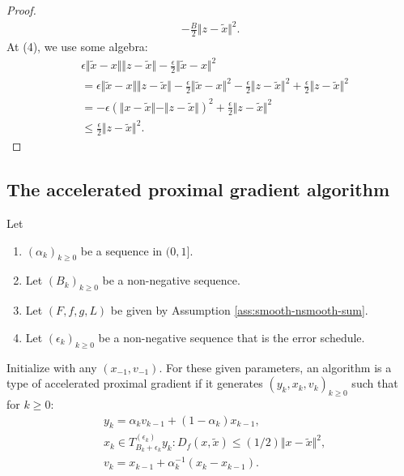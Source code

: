 \documentclass[12pt]{article}
\begin{document}
\begin{proof}
\begin{align*}
            - \frac{B}{2}\Vert z - \tilde x\Vert^2. 
        \end{align*}
        At (4), we use some algebra: 
        \begin{align*}
            &
            \epsilon \Vert \tilde x - x\Vert \Vert z - \tilde x\Vert
            - \frac{\epsilon}{2}\Vert \tilde x - x\Vert^2
            \\
            &=\epsilon \Vert \tilde x - x\Vert \Vert z - \tilde x\Vert
            - \frac{\epsilon}{2}\Vert \tilde x - x\Vert^2 - \frac{\epsilon}{2}\Vert z - \tilde x\Vert^2
            + \frac{\epsilon}{2}\Vert z - \tilde x\Vert^2
            \\
            &= 
            - \epsilon(\Vert x - \tilde x\Vert - \Vert z -\tilde x\Vert)^2 
            + \frac{\epsilon}{2}\Vert z - \tilde x\Vert^2 
            \\
            &\le \frac{\epsilon}{2}\Vert z - \tilde x\Vert^2. 
        \end{align*}
    \end{proof}
    \subsection{The accelerated proximal gradient algorithm}
        \begin{definition}\label{def:inxt-apg}
            Let 
            \begin{enumerate}[nosep]
                \item $(\alpha_k)_{k \ge 0}$ be a sequence in $(0, 1]$. 
                \item Let $(B_k)_{k \ge 0}$ be a non-negative sequence. 
                \item Let $(F, f, g, L)$ be given by Assumption \ref{ass:smooth-nsmooth-sum}. 
                \item Let $(\epsilon_k)_{k \ge 0}$ be a non-negative sequence that is the error schedule. 
            \end{enumerate}
            Initialize with any $(x_{-1}, v_{-1})$. 
            For these given parameters, an algorithm is a type of accelerated proximal gradient if it generates $(y_k, x_k, v_k)_{k \ge 0}$ such that
            for $k\ge 0$: 
            \begin{align*}
                & y_{k} = \alpha_{k} v_{k - 1} + (1 - \alpha_{k}) x_{k - 1},
                \\
                & x_k \in T_{B_k + \epsilon_k}^{(\epsilon_k)}y_k: D_f(x, \tilde x) \le (1/2)\Vert x - \tilde x\Vert^2, 
                \\
                & v_k = x_{k - 1} + \alpha_k^{-1}(x_k - x_{k - 1}).
            \end{align*}
        \end{definition}
\end{document}
